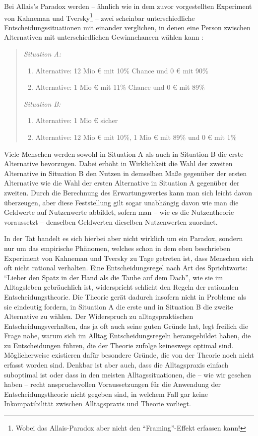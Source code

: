 Bei Allais's Paradox werden -- ähnlich wie in dem zuvor vorgestellten Experiment
von Kahneman und Tversky\footnote{Wobei das Allais-Paradox aber nicht den
"`Framing"'-Effekt erfassen kann!} -- zwei scheinbar unterschiedliche
Entscheidungssituationen mit einander verglichen, in denen eine Person zwischen
Alternativen mit unterschiedlichen Gewinnchancen wählen kann
\cite[]{myerson:1991}:

\begin{quote}
{\em Situation A:}
\begin{enumerate}
  \item Alternative: 12 Mio € mit 10\% Chance und 0 € mit 90\%
  \item Alternative: 1 Mio € mit 11\% Chance und 0 € mit 89\%
\end{enumerate}

{\em Situation B:}
\begin{enumerate}
  \item Alternative: 1 Mio € sicher
  \item Alternative: 12 Mio € mit 10\%, 1 Mio € mit 89\% und 0 € mit 1\% 
\end{enumerate}
\end{quote}

Viele Menschen werden sowohl in Situation A als auch in Situation B die erste
Alternative bevorzugen. Dabei erhöht in Wirklichkeit die Wahl der zweiten
Alternative in Situation B den Nutzen in demselben Maße gegenüber der ersten
Alternative wie die Wahl der ersten Alternative in Situation A gegenüber der
zweiten. Durch die Berechnung des Erwartungswertes kann man sich leicht davon
überzeugen, aber diese Feststellung gilt sogar unabhängig davon wie man die
Geldwerte auf Nutzenwerte abbildet, sofern man -- wie es die Nutzentheorie
voraussetzt -- denselben Geldwerten dieselben
Nutzenwerten zuordnet.

In der Tat handelt es sich hierbei aber nicht wirklich um ein Paradox, sondern
nur um das empirische Phänomen, welches schon in dem eben beschrieben Experiment
von Kahneman und Tversky zu Tage getreten ist, dass Menschen sich oft nicht
rational verhalten. Eine Entscheidungsregel nach Art des Sprichtworts: "`Lieber
den Spatz in der Hand als die Taube auf dem Dach"', wie sie im Alltagsleben
gebräuchlich ist, widerspricht schlicht den Regeln der rationalen
Entscheidungstheorie. Die Theorie gerät dadurch insofern nicht in Probleme als
sie eindeutig fordern, in Situation A die erste und in Situation B die zweite
Alternative zu wählen. Der Widerspruch zu alltagspraktischen
Entscheidungsverhalten, das ja oft auch seine guten Gründe hat, legt freilich die
Frage nahe, warum sich im Alltag Entscheidungsregeln herausgebildet haben, die zu
Entscheidungen führen, die der Theorie zufolge keineswegs optimal sind.
Möglicherweise existieren dafür besondere Gründe, die von der Theorie noch nicht
erfasst worden sind. Denkbar ist aber auch, dass die Alltagspraxis einfach
suboptimal ist oder dass in den meisten Alltagssituationen, die -- wie wir
gesehen haben -- recht anspruchsvollen Voraussetzungen für die Anwendung der
Entscheidungstheorie nicht gegeben sind, in welchem Fall gar keine
Inkompatibilität zwischen Alltagspraxis und Theorie vorliegt.

